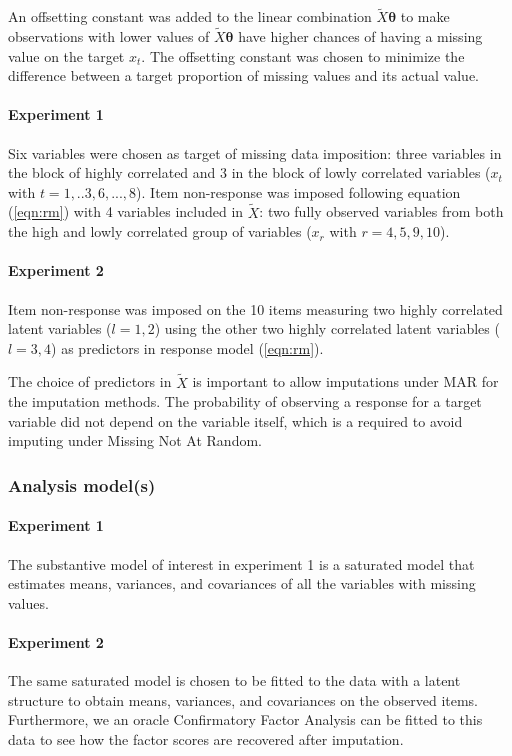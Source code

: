	An offsetting constant was added to the linear combination $\tilde{X}\bm{\theta}$ to make observations with 
	lower values of $\tilde{X}\bm{\theta}$ have higher chances of having a missing value on the target $x_t$. 
	The offsetting constant was chosen to minimize the difference between a target proportion of missing values 
	and its actual value.

	\paragraph{Experiment 1}
	Six variables were chosen as target of missing data imposition: three variables in the block of 
	highly correlated and 3 in the block of lowly correlated variables ($x_t$ with $t = 1,..3,6,...,8$). 
	Item non-response was imposed following equation (\ref{eqn:rm}) with 4 variables included in $\tilde{X}$: two fully 
	observed variables from both the high and lowly correlated group of variables ($x_r$ with $r = 4,5,9,10$).

	\paragraph{Experiment 2}
	Item non-response was imposed on the 10 items measuring two highly correlated latent variables ($l = 1, 2$) 
	using the other two highly correlated latent variables ($l = 3, 4$) as predictors in response model (\ref{eqn:rm}). 

	The choice of predictors in $\tilde{X}$ is important to allow imputations under MAR for the imputation methods. 
	The probability of observing a response for a target variable did not depend on the variable itself, which is a 
	required to avoid imputing under Missing Not At Random.

\subsubsection{Analysis model(s)}
	
	\paragraph{Experiment 1}
	The substantive model of interest in experiment 1 is a saturated model that estimates means,
	variances, and covariances of all the variables with missing values.

	\paragraph{Experiment 2}
	The same saturated model is chosen to be fitted to the data with a latent structure to obtain means, variances, 
	and covariances on the observed items.
	Furthermore, we an oracle Confirmatory Factor Analysis can be fitted to this data to see how the factor scores 
	are recovered after imputation.

